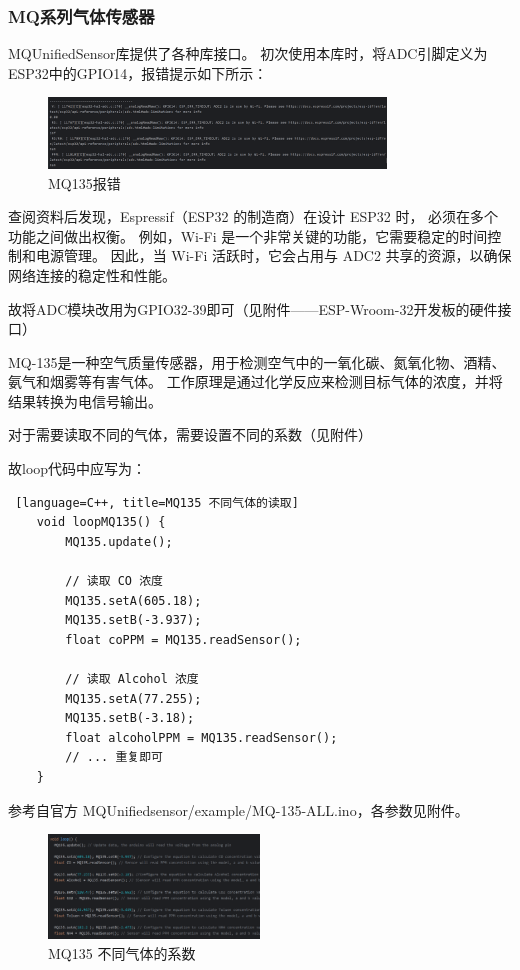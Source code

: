 \subsubsection{MQ系列气体传感器}

MQUnifiedSensor库提供了各种库接口。
初次使用本库时，将ADC引脚定义为ESP32中的GPIO14，报错提示如下所示：

\begin{figure} [H]
    \centering
    \includegraphics[width=0.8\textwidth]{img/MQ135_error.png}
    \caption{MQ135报错}
    \label{fig:MQ135_error}
\end{figure}

查阅资料后发现，Espressif（ESP32 的制造商）在设计 ESP32 时，
必须在多个功能之间做出权衡。
例如，Wi-Fi 是一个非常关键的功能，它需要稳定的时间控制和电源管理。
因此，当 Wi-Fi 活跃时，它会占用与 ADC2 共享的资源，以确保网络连接的稳定性和性能。

故将ADC模块改用为GPIO32-39即可（见\textcolor{mygreen}{附件}——ESP-Wroom-32开发板的硬件接口）

MQ-135是一种空气质量传感器，用于检测空气中的一氧化碳、氮氧化物、酒精、氨气和烟雾等有害气体。
工作原理是通过化学反应来检测目标气体的浓度，并将结果转换为电信号输出。

对于需要读取不同的气体，需要设置不同的系数（见\textcolor{mygreen}{附件}）

故loop代码中应写为：

\begin{lstlisting} [language=C++, title=MQ135 不同气体的读取]
    void loopMQ135() {
        MQ135.update();
    
        // 读取 CO 浓度
        MQ135.setA(605.18);
        MQ135.setB(-3.937);
        float coPPM = MQ135.readSensor();
    
        // 读取 Alcohol 浓度
        MQ135.setA(77.255);
        MQ135.setB(-3.18);
        float alcoholPPM = MQ135.readSensor();
        // ... 重复即可
    }
\end{lstlisting}

参考自官方 MQUnifiedsensor/example/MQ-135-ALL.ino，各参数见\textcolor{mygreen}{附件}。

\begin{figure} [H]
    \centering
    \includegraphics[width=0.5\textwidth]{img/MQ135_Para.png}
    \caption{MQ135 不同气体的系数}
    \label{fig:MQ135_coefficient}
\end{figure}

